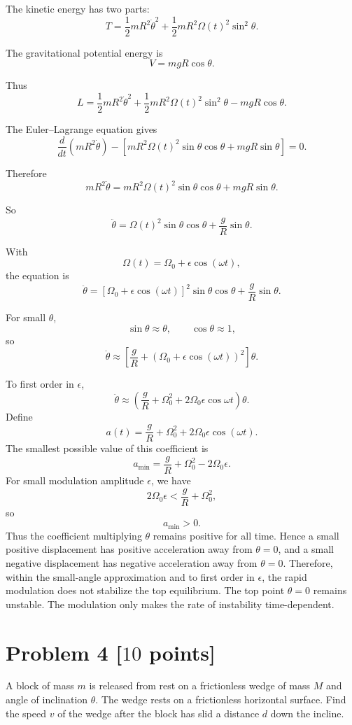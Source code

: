 \documentclass[11pt, a4paper]{article} %
\begin{document}
The kinetic energy has two parts:
\[
T=\frac12 mR^2\dot\theta^2
+
\frac12 mR^2\Omega(t)^2\sin^2\theta.
\]

The gravitational potential energy is
\[
V=mgR\cos\theta.
\]

Thus
\[
L
=
\frac12 mR^2\dot\theta^2
+
\frac12 mR^2\Omega(t)^2\sin^2\theta
-
mgR\cos\theta.
\]

The Euler--Lagrange equation gives
\[
\frac{d}{dt}\left(mR^2\dot\theta\right)
-
\left[
mR^2\Omega(t)^2\sin\theta\cos\theta
+
mgR\sin\theta
\right]
=0.
\]

Therefore
\[
mR^2\ddot\theta
=
mR^2\Omega(t)^2\sin\theta\cos\theta
+
mgR\sin\theta.
\]

So
\[
\boxed{
\ddot\theta
=
\Omega(t)^2\sin\theta\cos\theta
+
\frac{g}{R}\sin\theta.
}
\]

With
\[
\Omega(t)=\Omega_0+\epsilon\cos(\omega t),
\]
the equation is
\[
\boxed{
\ddot\theta
=
\left[\Omega_0+\epsilon\cos(\omega t)\right]^2
\sin\theta\cos\theta
+
\frac{g}{R}\sin\theta.
}
\]

For small \(\theta\),
\[
\sin\theta\approx \theta,
\qquad
\cos\theta\approx 1,
\]
so
\[
\boxed{
\ddot\theta
\approx
\left[
\frac{g}{R}
+
\left(\Omega_0+\epsilon\cos(\omega t)\right)^2
\right]\theta.
}
\]

To first order in \(\epsilon\),
\[
\boxed{
\ddot\theta
\approx
\left(
\frac{g}{R}
+\Omega_0^2
+2\Omega_0\epsilon\cos\omega t
\right)\theta.
}
\]
Define
\[
a(t)=
\frac{g}{R}
+\Omega_0^2
+2\Omega_0\epsilon\cos(\omega t).
\]
The smallest possible value of this coefficient is
\[
a_{\min}
=
\frac{g}{R}
+\Omega_0^2
-2\Omega_0\epsilon.
\]
For small modulation amplitude $\epsilon$, we have
\[
2\Omega_0\epsilon
<
\frac{g}{R}+\Omega_0^2,
\]
so
\[
a_{\min}>0.
\]
Thus the coefficient multiplying $\theta$ remains positive for all time. Hence a small positive displacement has positive acceleration away from $\theta=0$, and a small negative displacement has negative acceleration away from $\theta=0$. Therefore, within the small-angle approximation and to first order in $\epsilon$, the rapid modulation does not stabilize the top equilibrium. The top point $\theta=0$ remains unstable. The modulation only makes the rate of instability time-dependent.



\newpage
\section*{Problem 4 [$10$ points]}
A block of mass $m$ is released from rest on a frictionless wedge of mass $M$ and angle of inclination $\theta$. The wedge rests on a frictionless horizontal surface. Find the speed $v$ of the wedge after the block has slid a distance $d$ down the incline.
\end{document}
